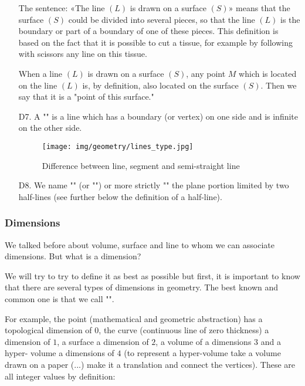 \begin{enumerate}
	\begin{tcolorbox}[title=Remark,colframe=black,arc=10pt]
		The sentence: «The line $(L)$ is drawn on a surface $(S)$» means that the surface $(S)$ could be divided into several pieces, so that the line $(L)$ is the boundary or part of a boundary of one of these pieces. This definition is based on the fact that it is possible to cut a tissue, for example by following with scissors any line on this tissue.
	\end{tcolorbox}

When a line $(L)$ is drawn on a surface $(S)$, any point $M$ which is located on the line $(L)$ is, by definition, also located on the surface $(S)$. Then we say that it is a "point of this surface."

		\item[D7.] A "" is a line which has a boundary (or vertex) on one side and is infinite on the other side.
		
		\begin{figure}[H]
		\centering
		\texttt{[image: img/geometry/lines\_type.jpg]}
		\caption{Difference between line, segment and semi-straight line}
		\end{figure}
		
		\item[D8.] We name "" (or "") or more strictly "" the plane portion limited by two half-lines (see further below the definition of a half-line).
	\end{enumerate}
	
	\subsubsection{Dimensions}\label{dimensions}

We talked before about volume, surface and line to whom we can associate dimensions. But what is a dimension? 

We will try to try to define it as best as possible but first, it is important to know that there are several types of dimensions in geometry. The best known and common one is that we call "".

For example, the point (mathematical and geometric abstraction) has a topological dimension of $0$, the curve (continuous line of zero thickness) a dimension of $1$, a  surface a dimension of $2$, a volume of a dimensions $3$ and a hyper- volume a dimensions of $4$ (to represent a hyper-volume take a volume drawn on a paper (...) make it a translation and connect the vertices). These are all integer values by definition:

